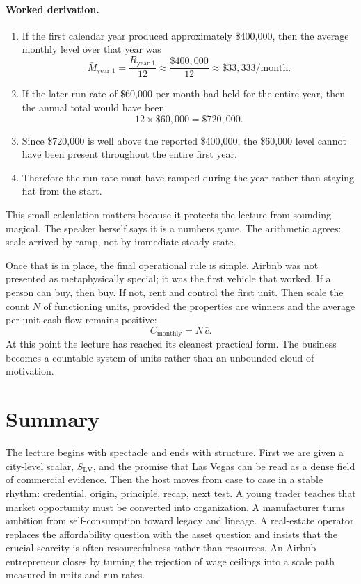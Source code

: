 \paragraph{Worked derivation.}
\begin{enumerate}
\item If the first calendar year produced approximately \$400{,}000, then the average monthly level over that year was
\begin{equation}
\bar M_{\text{year 1}} = \frac{R_{\text{year 1}}}{12} \approx \frac{\$400{,}000}{12} \approx \$33{,}333/\text{month}.
\end{equation}
\item If the later run rate of \$60{,}000 per month had held for the entire year, then the annual total would have been
\begin{equation}
12\times \$60{,}000 = \$720{,}000.
\end{equation}
\item Since \$720{,}000 is well above the reported \$400{,}000, the \$60{,}000 level cannot have been present throughout the entire first year.
\item Therefore the run rate must have ramped during the year rather than staying flat from the start.
\end{enumerate}

This small calculation matters because it protects the lecture from sounding magical. The speaker herself says it is a numbers game. The arithmetic agrees: scale arrived by ramp, not by immediate steady state.

Once that is in place, the final operational rule is simple. Airbnb was not presented as metaphysically special; it was the first vehicle that worked. If a person can buy, then buy. If not, rent and control the first unit. Then scale the count \(N\) of functioning units, provided the properties are winners and the average per-unit cash flow remains positive:
\begin{equation}
C_{\mathrm{monthly}} = N\,\bar c.
\end{equation}
At this point the lecture has reached its cleanest practical form. The business becomes a countable system of units rather than an unbounded cloud of motivation.

\section{Summary}

The lecture begins with spectacle and ends with structure. First we are given a city-level scalar, \(S_{\mathrm{LV}}\), and the promise that Las Vegas can be read as a dense field of commercial evidence. Then the host moves from case to case in a stable rhythm: credential, origin, principle, recap, next test. A young trader teaches that market opportunity must be converted into organization. A manufacturer turns ambition from self-consumption toward legacy and lineage. A real-estate operator replaces the affordability question with the asset question and insists that the crucial scarcity is often resourcefulness rather than resources. An Airbnb entrepreneur closes by turning the rejection of wage ceilings into a scale path measured in units and run rates.

